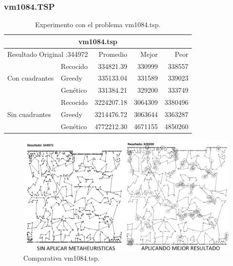 \subsubsection{vm1084.TSP}
\begin{table}[hbtp]
 \centering 
    \caption{Experimento con el problema vm1084.tsp.} 
	\begin{tabular}{ | l   l | r | r | r |   }
         \hline \multicolumn{5}{|c|}{ \rowcolor[gray]{0.8}vm1084.tsp} \\\hline
         \multicolumn{2}{|l|}{Resultado Original :344972}  & Promedio & Mejor & Peor \\ \hline
                & Recocido  & 334821.39 & 330999 & 338557 \\ 
 Con cuadrantes & Greedy    & 335133.04 & 331589 & 339023 \\ 
                & Genético  & \cellcolor[gray]{0.9} 331384.21 & \cellcolor[gray]{0.9} 329200 & \cellcolor[gray]{0.9} 333749 \\ 
                \hline
                & Recocido  & 3224207.18 & 3064309 & 3380496 \\ 
 Sin cuadrantes & Greedy    & \cellcolor[gray]{0.9} 3214476.72 & \cellcolor[gray]{0.9} 3063644 & \cellcolor[gray]{0.9} 3363287\\
                & Genético  & 4772212.30 & 4671155 & 4850260 \\ 
                \hline
    \end{tabular}
    \label{table:EXP_vm1084.tsp}
\end{table}
\begin{figure}[hbtp]
    \centering
        \includegraphics[width=1\textwidth]{PruebasResultados/Experimentos_Comparativas/vm1084.png}
        \caption{Comparativa vm1084.tsp.}
        \label{fig:vm1084_comparativa.png}
\end{figure}
